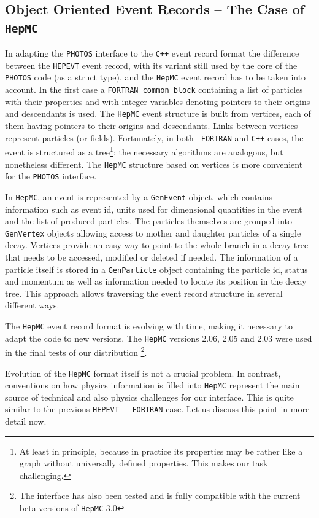 \documentclass[]{Photos_interface_design}
\begin{document}
\subsection{Object Oriented Event Records  -- The Case of {\tt HepMC}}
 In adapting the {\tt PHOTOS} interface to the {\tt C++} event record format
the difference between the {\tt HEPEVT} event record, with its variant still used
by the core of the {\tt PHOTOS} code (as a struct type),
and the {\tt HepMC} event record has to be taken into account.  In the first case 
a {\tt FORTRAN common block} containing a list of particles with their properties and
with integer variables denoting pointers to their origins and
descendants is used.  The {\tt HepMC} event structure is built from vertices,
each of them having pointers to their origins and descendants. Links
between vertices represent particles (or fields).  Fortunately, in both {\tt
  FORTRAN} and {\tt C++} cases, the event is structured as a
tree\footnote{At least in principle, because in practice its
properties may be rather like a graph without universally defined
properties.  This makes our task challenging.}; the necessary
algorithms are analogous, but nonetheless different. The {\tt HepMC}
structure based on vertices is more convenient for the {\tt PHOTOS}
interface. 

In {\tt HepMC}, an event is represented by a {\tt GenEvent} object,
which contains information such as event id,
units used for dimensional quantities in the event and the list of produced particles. The particles
themselves are grouped into {\tt GenVertex} objects allowing access to mother
and daughter particles of a single decay. Vertices provide an easy way
to point to the whole branch in a decay tree that needs to be accessed,
modified or deleted if needed. The information of a particle  itself is stored
in a {\tt GenParticle} object containing the particle id, status and momentum
as well as information needed to locate its position in the decay tree.
This approach allows traversing the event record structure in several different
ways.

The {\tt HepMC} event record format is  evolving with time, making it necessary
 to adapt
the code to new versions. The
{\tt HepMC} versions 2.06, 2.05  and 2.03 were used  in the final tests of our 
distribution%
\footnote{The interface has also been tested and is fully compatible
with the current beta versions of {\tt HepMC} 3.0}.

Evolution of the {\tt HepMC} format itself is not a crucial problem.
In contrast, conventions on how physics information is  filled into {\tt HepMC}
represent the main source of technical and also physics 
challenges for our interface. 
This is quite similar to the previous
{\tt HEPEVT - FORTRAN} case. Let us discuss this point in more detail now.
\end{document}
